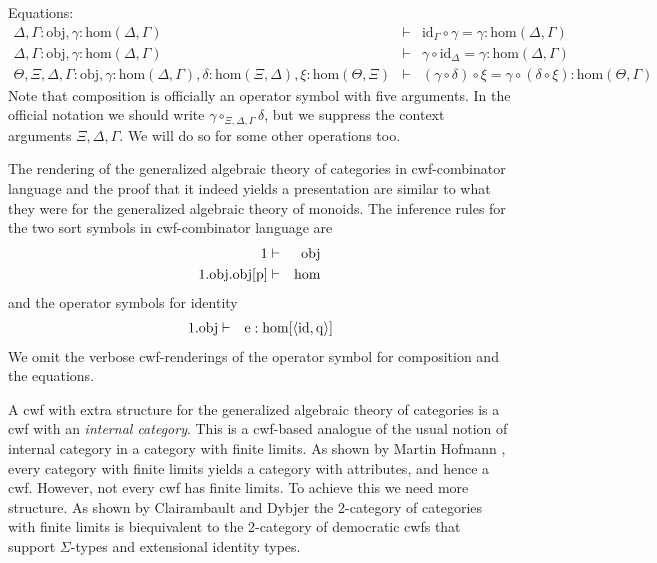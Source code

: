 \documentclass{mscs}
\newcommand{\FYI}[1]{{#1}}
\def\Obj{\mathrm{obj}}
\def\Ctx{\mathrm{Ctx}}
\def\Hom{\mathrm{hom}}
\def\id{\mathrm{id}}
\def\idmon{\mathrm{e}}
\begin{document}
Equations:
\begin{eqnarray*}
\Delta, \Gamma : \Obj, \gamma : \Hom(\Delta,\Gamma) &\vdash& \id_\Gamma \circ \gamma = \gamma : \Hom(\Delta,\Gamma)\\
\Delta, \Gamma : \Obj, \gamma : \Hom(\Delta,\Gamma) &\vdash& \gamma \circ \id_\Delta = \gamma : \Hom(\Delta,\Gamma)\\
\Theta, \Xi,\Delta,\Gamma : \Obj, \gamma : \Hom(\Delta,\Gamma), \delta : \Hom(\Xi,\Delta), \xi : \Hom(\Theta,\Xi) &\vdash&
(\gamma \circ \delta) \circ \xi = \gamma \circ (\delta \circ \xi): \Hom(\Theta,\Gamma)
\end{eqnarray*}
Note that composition is officially an operator symbol with five arguments. In the official notation we should write $\gamma \circ_{\Xi,\Delta,\Gamma} \delta$, but we suppress the context arguments $\Xi,\Delta,\Gamma$. We will do so for some other operations too.

The rendering of the generalized algebraic theory of categories in cwf-combinator language and the proof that it indeed yields a \FYI{presentation} are similar to what they were for the generalized algebraic theory of monoids. The inference rules for the two sort symbols in cwf-combinator language are
\begin{eqnarray*}
1 &\vdash& \Obj\\
1.\Obj.\Obj[\p] &\vdash& \Hom
\end{eqnarray*}
and the operator symbols for identity
\begin{eqnarray*}
1.\Obj &\vdash& \idmon : \Hom[\tuple{\id,\q}]
\end{eqnarray*}
We omit the verbose cwf-renderings of the operator symbol for composition and the equations.

A cwf with extra structure for the generalized algebraic theory of categories is a cwf with an {\em internal category}. This is a cwf-based analogue of the usual notion of internal category in a category with finite limits. As shown by Martin Hofmann \cite{hofmann:csl,hofmann:cambridge}, every category with finite limits yields a category with attributes, and hence a cwf. However, not every cwf has finite limits. To achieve this we need more structure. As shown by Clairambault and Dybjer \cite{ClairambaultD11,ClairambaultD14} the 2-category of categories with finite limits is biequivalent to the 2-category of democratic cwfs that support $\Sigma$-types and extensional identity types.
\end{document}
